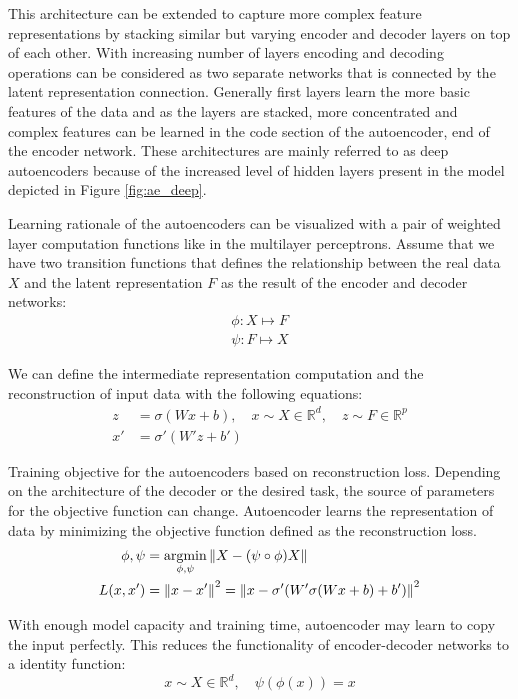 This architecture can be extended to capture more
complex feature representations by stacking similar but varying encoder and decoder layers on top of
each other. With increasing number of layers encoding and decoding operations can be considered as two separate 
networks that is connected by the latent representation connection. Generally first layers learn the more basic features 
of the data and as the layers are stacked, more concentrated and complex features can be learned in the code section 
of the autoencoder, end of the encoder network. These architectures are mainly referred to as deep
autoencoders because of the increased level of hidden layers present in the model depicted in Figure
\ref{fig:ae_deep}.

Learning rationale of the autoencoders can be visualized with a pair of weighted layer computation
functions like in the multilayer perceptrons. Assume that we have two transition functions that
defines the relationship between the real data $X$ and the latent representation $F$ as the result of
the encoder and decoder networks:
\begin{align*}
    \phi : X \mapsto F \\
    \psi : F \mapsto X     
\end{align*}

We can define the intermediate representation computation and the reconstruction of input data
with the following equations:
\begin{align}  
    z  &= \sigma( W x + b) ,\quad x \sim X \in \mathbb{R}^d ,\quad z \sim F \in \mathbb{R}^p \\
    x'  &= \sigma' (W' z + b') 
\end{align}

Training objective for the autoencoders based on reconstruction loss. Depending on the
architecture of the decoder or the desired task, the source of parameters for the objective
function can change. Autoencoder learns the representation of data by minimizing the objective function 
defined as the reconstruction loss. 
\begin{align}
    \label{eqn:ae_rec}
  \phi, \psi & = \underset{\phi, \psi}{\text{argmin}} \left\lVert X - (\psi \circ \phi) X\right\rVert \\  
  L(x, x') & = \left\lVert x - x'\right\rVert^2 = \left\lVert x - \sigma' (W' \sigma (W x + b) + b')\right\rVert^2
\end{align}

With enough model capacity and training time, autoencoder may learn to copy the input perfectly.
This reduces the functionality of encoder-decoder networks to a identity function:
$$
 x \sim X \in \mathbb{R}^d, \quad \psi(\phi(x)) = x
$$

